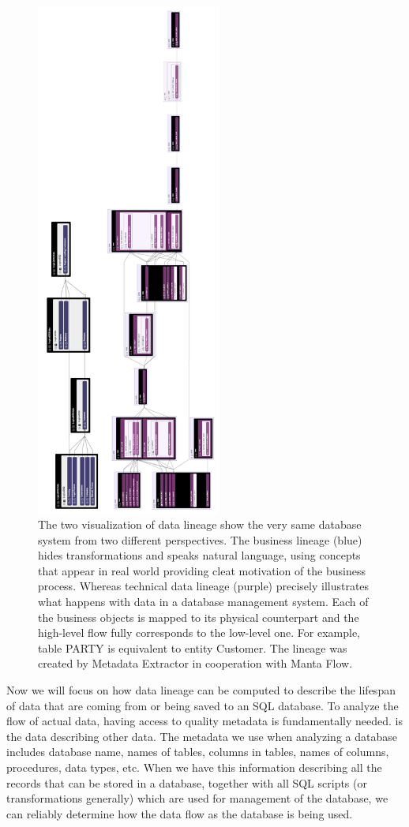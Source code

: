 \begin{figure}[H]
	\centering
	\includegraphics[height=17cm]{../img/LogicalvsPhysicalLineage}
	\caption[Technical Lineage versus Business Lineage]{The two visualization of data lineage show the very same database system from two different perspectives. The business lineage (blue) hides transformations and speaks natural language, using concepts that appear in real world providing cleat motivation of the business process.
	Whereas technical data lineage (purple) precisely illustrates what happens with data in a database management system. Each of the business objects is mapped to its physical counterpart and the high-level flow fully corresponds to the low-level one. 
	For example, table PARTY is equivalent to entity Customer. The lineage was created by Metadata Extractor in cooperation with Manta Flow.}
	\label{BusinessVsTechnicalLineage}
\end{figure}

Now we will focus on how data lineage can be computed to describe the lifespan of data that are coming from or being saved to an SQL database.
To analyze the flow of actual data, having access to quality metadata is fundamentally needed.
 is the data describing other data. The metadata we use when analyzing a database includes database name, names of tables, columns in tables, names of columns, procedures, data types, etc.
When we have this information describing all the records that can be stored in a database, together with all SQL scripts (or transformations generally) which are used for management of the database, we can reliably determine how the data flow as the database is being used.

